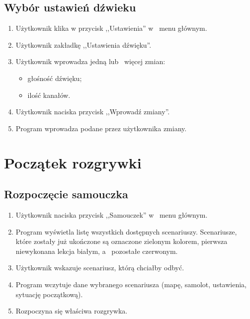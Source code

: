 \documentclass{mwrep}
\begin{document}
\section{Wybór ustawień dźwieku}
\begin{enumerate}
  \item Użytkownik klika w przycisk ,,Ustawienia'' w~ menu głównym.
  \item Użytkownik zakładkę ,,Ustawienia dźwięku''.
  \item Użytkownik wprowadza jedną lub~ więcej zmian:
  \begin{itemize}
    \item głośność dźwięku;
    \item ilość kanałów.
  \end{itemize}
  \item Użytkownik naciska przycisk ,,Wprowadź zmiany''.
  \item Program wprowadza podane przez użytkownika zmiany.
\end{enumerate}

\chapter{Początek rozgrywki}
\section{Rozpoczęcie samouczka}
\begin{enumerate}
  \item Użytkownik naciska przycisk ,,Samouczek'' w~ menu głównym.
  \item Program wyświetla listę wszystkich dostępnych scenariuszy. Scenariusze, które zostały już ukończone są oznaczone zielonym kolorem, pierwsza niewykonana lekcja białym, a~ pozostałe czerwonym.
  \item Użytkownik wskazuje scenariusz, którą chciałby odbyć.
  \item Program wczytuje dane wybranego scenariusza (mapę, samolot, ustawienia, sytuację początkową).
  \item Rozpoczyna się właściwa rozgrywka.
\end{enumerate}
\end{document}
